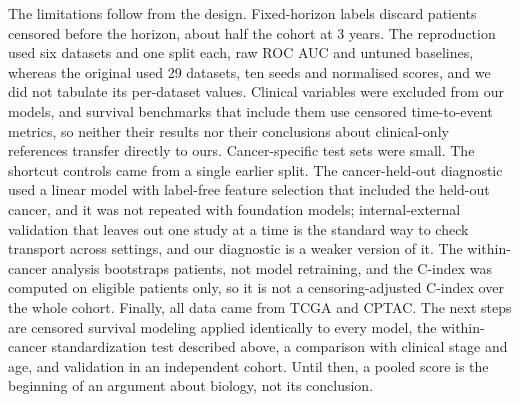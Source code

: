 The limitations follow from the design. Fixed-horizon labels discard patients censored before the horizon, about half the cohort at 3 years. The reproduction used six datasets and one split each, raw ROC AUC and untuned baselines, whereas the original used 29 datasets, ten seeds and normalised scores, and we did not tabulate its per-dataset values. Clinical variables were excluded from our models, and survival benchmarks that include them use censored time-to-event metrics, so neither their results nor their conclusions about clinical-only references transfer directly to ours.\citep{herrmann2021benchmark,li2024combining} Cancer-specific test sets were small. The shortcut controls came from a single earlier split. The cancer-held-out diagnostic used a linear model with label-free feature selection that included the held-out cancer, and it was not repeated with foundation models; internal-external validation that leaves out one study at a time is the standard way to check transport across settings,\citep{riley2016external} and our diagnostic is a weaker version of it. The within-cancer analysis bootstraps patients, not model retraining, and the C-index was computed on eligible patients only, so it is not a censoring-adjusted C-index over the whole cohort. Finally, all data came from TCGA and CPTAC. The next steps are censored survival modeling applied identically to every model, the within-cancer standardization test described above, a comparison with clinical stage and age, and validation in an independent cohort. Until then, a pooled score is the beginning of an argument about biology, not its conclusion.
